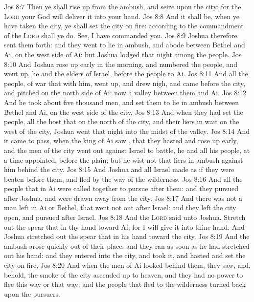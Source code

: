 \vs Jos 8:7 Then ye shall rise up from the ambush, and seize upon the city: for the \textsc{Lord} your God will deliver it into your hand.
\vs Jos 8:8 And it shall be, when ye have taken the city,  ye shall set the city on fire: according to the commandment of the \textsc{Lord} shall ye do. See, I have commanded you.
\vs Jos 8:9 Joshua therefore sent them forth: and they went to lie in ambush, and abode between Bethel and Ai, on the west side of Ai: but Joshua lodged that night among the people.
\vs Jos 8:10 And Joshua rose up early in the morning, and numbered the people, and went up, he and the elders of Israel, before the people to Ai.
\vs Jos 8:11 And all the people,  of war that  with him, went up, and drew nigh, and came before the city, and pitched on the north side of Ai: now  a valley between them and Ai.
\vs Jos 8:12 And he took about five thousand men, and set them to lie in ambush between Bethel and Ai, on the west side of the city.
\vs Jos 8:13 And when they had set the people,  all the host that  on the north of the city, and their liers in wait on the west of the city, Joshua went that night into the midst of the valley.
\vs Jos 8:14 And it came to pass, when the king of Ai saw , that they hasted and rose up early, and the men of the city went out against Israel to battle, he and all his people, at a time appointed, before the plain; but he wist not that  liers in ambush against him behind the city.
\vs Jos 8:15 And Joshua and all Israel made as if they were beaten before them, and fled by the way of the wilderness.
\vs Jos 8:16 And all the people that  in Ai were called together to pursue after them: and they pursued after Joshua, and were drawn away from the city.
\vs Jos 8:17 And there was not a man left in Ai or Bethel, that went not out after Israel: and they left the city open, and pursued after Israel.
\vs Jos 8:18 And the \textsc{Lord} said unto Joshua, Stretch out the spear that  in thy hand toward Ai; for I will give it into thine hand. And Joshua stretched out the spear that  in his hand toward the city.
\vs Jos 8:19 And the ambush arose quickly out of their place, and they ran as soon as he had stretched out his hand: and they entered into the city, and took it, and hasted and set the city on fire.
\vs Jos 8:20 And when the men of Ai looked behind them, they saw, and, behold, the smoke of the city ascended up to heaven, and they had no power to flee this way or that way: and the people that fled to the wilderness turned back upon the pursuers.
